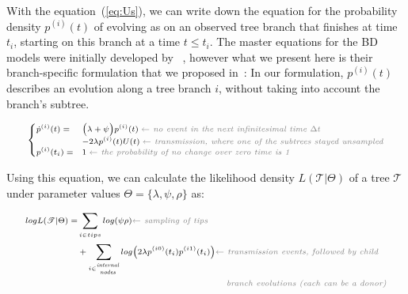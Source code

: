 \documentclass[a4paper,10pt]{article}
\begin{document}
With the equation~(\ref{eq:Us}), we can write down the equation for the probability density $p^{(i)}(t)$ of evolving as on an observed tree branch that finishes at time $t_i$, starting on this branch at a time $t \leq t_i$. The master equations for the BD models were initially developed by ~\citet{Stadler2009}, however what we present here is their branch-specific formulation that we proposed in~\citep{zhukovaFastAccurateMaximumLikelihood2022}:
In our formulation, ${p}^{(i)}(t)$ describes an evolution along a tree branch $i$, without taking into account the branch's subtree. %

\begin{equation}
\scriptsize
\begin{cases}
\dot{p}^{(i)}(t) = & \Big(\lambda + \psi\Big) p^{(i)}(t)\; \textit{\color{gray} $\leftarrow$ no event in the next infinitesimal time $\Delta t$ }\\
    & - 2 \lambda p^{(i)}(t)U(t)\;  \textit{\color{gray} $\leftarrow$ transmission, where one of the subtrees stayed unsampled}\\
p^{(i)}(t_i) =  &1\;  \textit{\color{gray} $\leftarrow$ the probability of no change over zero time is 1}
\end{cases}\label{eq:p}
\end{equation}


Using this equation, we can calculate the likelihood density $L(\mathscr{T}|\Theta)$ of a tree $\mathscr{T}$ under parameter values $\Theta = \{\lambda, \psi, \rho\}$ as:

\begin{equation}
\scriptsize
\begin{split}
log L(\mathscr{T}|\Theta) =  &\sum\limits_{i \in tips}  log(\psi \rho)  \textit{\color{gray} $\leftarrow$ sampling of tips} \\
 &+\sum\limits_{i \in \stackanchor{\tiny\textit{internal}}{\tiny\textit{nodes}}} log \big(2 \lambda p^{(i0)}(t_i)p^{(i1)}(t_i)\big)   \textit{\color{gray} $\leftarrow$ transmission events, followed by child }\\
 & ~~~~~~~~~~~~~~~~~~~~~~~~~~~~~~~~~~~~~~~~~~~~~~~~~~\textit{\color{gray} branch evolutions (each can be a donor)}  \label{eq:mtbd_tree_likelihood}
\end{split}
\end{equation}
\end{document}
